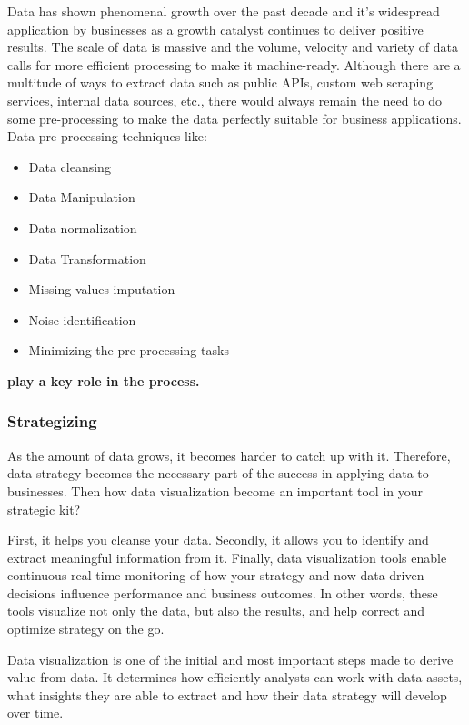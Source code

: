 \documentclass[]{book}
\providecommand{\tightlist}{%
  \setlength{\itemsep}{0pt}\setlength{\parskip}{0pt}}
\theoremstyle{definition}
\theoremstyle{definition}
\theoremstyle{definition}
\theoremstyle{remark}
\begin{document}
Data has shown phenomenal growth over the past decade and it's
widespread application by businesses as a growth catalyst continues to
deliver positive results. The scale of data is massive and the volume,
velocity and variety of data calls for more efficient processing to make
it machine-ready. Although there are a multitude of ways to extract data
such as public APIs, custom web scraping services, internal data
sources, etc., there would always remain the need to do some
pre-processing to make the data perfectly suitable for business
applications. Data pre-processing techniques like:

\begin{itemize}
\tightlist
\item
  Data cleansing
\item
  Data Manipulation
\item
  Data normalization
\item
  Data Transformation
\item
  Missing values imputation
\item
  Noise identification
\item
  Minimizing the pre-processing tasks
\end{itemize}

\textbf{play a key role in the process.}

\subsubsection{Strategizing}\label{strategizing}

As the amount of data grows, it becomes harder to catch up with it.
Therefore, data strategy becomes the necessary part of the success in
applying data to businesses. Then how data visualization become an
important tool in your strategic kit?

First, it helps you cleanse your data. Secondly, it allows you to
identify and extract meaningful information from it. Finally, data
visualization tools enable continuous real-time monitoring of how your
strategy and now data-driven decisions influence performance and
business outcomes. In other words, these tools visualize not only the
data, but also the results, and help correct and optimize strategy on
the go.

Data visualization is one of the initial and most important steps made
to derive value from data. It determines how efficiently analysts can
work with data assets, what insights they are able to extract and how
their data strategy will develop over time.
\end{document}
